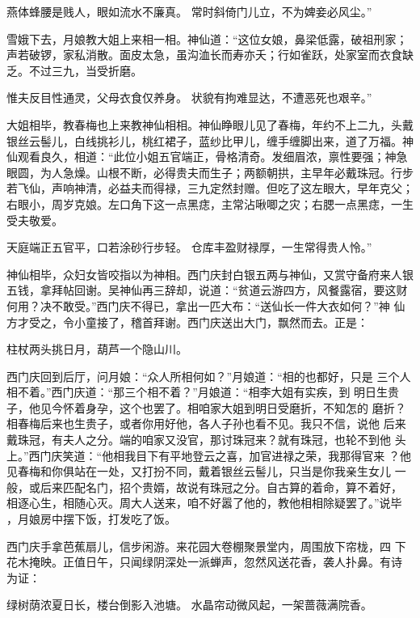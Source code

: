 燕体蜂腰是贱人，眼如流水不廉真。
常时斜倚门儿立，不为婢妾必风尘。”

雪娥下去，月娘教大姐上来相一相。神仙道：“这位女娘，鼻梁低露，破祖刑家；
声若破锣，家私消散。面皮太急，虽沟洫长而寿亦夭；行如雀跃，处家室而衣食缺
乏。不过三九，当受折磨。

惟夫反目性通灵，父母衣食仅养身。
状貌有拘难显达，不遭恶死也艰辛。”

大姐相毕，教春梅也上来教神仙相相。神仙睁眼儿见了春梅，年约不上二九，头戴
银丝云髻儿，白线挑衫儿，桃红裙子，蓝纱比甲儿，缠手缠脚出来，道了万福。神
仙观看良久，相道：“此位小姐五官端正，骨格清奇。发细眉浓，禀性要强；神急
眼圆，为人急燥。山根不断，必得贵夫而生子；两额朝拱，主早年必戴珠冠。行步
若飞仙，声响神清，必益夫而得禄，三九定然封赠。但吃了这左眼大，早年克父；
右眼小，周岁克娘。左口角下这一点黑痣，主常沾啾唧之灾；右腮一点黑痣，一生
受夫敬爱。

天庭端正五官平，口若涂砂行步轻。
仓库丰盈财禄厚，一生常得贵人怜。”

神仙相毕，众妇女皆咬指以为神相。西门庆封白银五两与神仙，又赏守备府来人银
五钱，拿拜帖回谢。吴神仙再三辞却，说道：“贫道云游四方，风餐露宿，要这财
何用？决不敢受。”西门庆不得已，拿出一匹大布：“送仙长一件大衣如何？”神
仙方才受之，令小童接了，稽首拜谢。西门庆送出大门，飘然而去。正是：

柱杖两头挑日月，葫芦一个隐山川。

西门庆回到后厅，问月娘：“众人所相何如？”月娘道：“相的也都好，只是
三个人相不着。”西门庆道：“那三个相不着？”月娘道：“相李大姐有实疾，到
明日生贵子，他见今怀着身孕，这个也罢了。相咱家大姐到明日受磨折，不知怎的
磨折？相春梅后来也生贵子，或者你用好他，各人子孙也看不见。我只不信，说他
后来戴珠冠，有夫人之分。端的咱家又没官，那讨珠冠来？就有珠冠，也轮不到他
头上。”西门庆笑道：“他相我目下有平地登云之喜，加官进禄之荣，我那得官来
？他见春梅和你俱站在一处，又打扮不同，戴着银丝云髻儿，只当是你我亲生女儿
一般，或后来匹配名门，招个贵婿，故说有珠冠之分。自古算的着命，算不着好，
相逐心生，相随心灭。周大人送来，咱不好嚣了他的，教他相相除疑罢了。”说毕
，月娘房中摆下饭，打发吃了饭。

西门庆手拿芭蕉扇儿，信步闲游。来花园大卷棚聚景堂内，周围放下帘栊，四
下花木掩映。正值日午，只闻绿阴深处一派蝉声，忽然风送花香，袭人扑鼻。有诗
为证：

绿树荫浓夏日长，楼台倒影入池塘。
水晶帘动微风起，一架蔷薇满院香。

